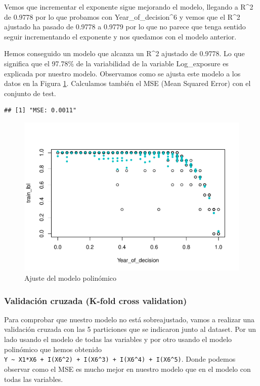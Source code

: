 \documentclass[
]{article}
\begin{document}
Vemos que incrementar el exponente sigue mejorando el modelo, llegando a
R\^{}2 de 0.9778 por lo que probamos con Year\_of\_decision\^{}6 y vemos
que el R\^{}2 ajustado ha pasado de 0.9778 a 0.9779 por lo que no parece
que tenga sentido seguir incrementando el exponente y nos quedamos con
el modelo anterior.

Hemos conseguido un modelo que alcanza un R\^{}2 ajustado de 0.9778. Lo
que significa que el 97.78\% de la variabilidad de la variable
Log\_exposure es explicada por nuestro modelo. Observamos como se ajusta
este modelo a los datos en la Figura \ref{fig:model_pol}. Calculamos
también el MSE (Mean Squared Error) con el conjunto de test.

\begin{verbatim}
## [1] "MSE: 0.0011"
\end{verbatim}

\begin{figure}

{\centering \includegraphics[width=0.75\linewidth]{anacalt-regresion_files/figure-latex/model_pol-1} 

}

\caption{Ajuste del modelo polinómico}\label{fig:model_pol}
\end{figure}

\hypertarget{validaciuxf3n-cruzada-k-fold-cross-validation}{%
\subsubsection{Validación cruzada (K-fold cross
validation)}\label{validaciuxf3n-cruzada-k-fold-cross-validation}}

Para comprobar que nuestro modelo no está sobreajustado, vamos a
realizar una validación cruzada con las 5 particiones que se indicaron
junto al dataset. Por un lado usando el modelo de todas las variables y
por otro usando el modelo polinómico que hemos obtenido
\texttt{\textquotesingle{}Y\ \textasciitilde{}\ X1*X6\ +\ I(X6\^{}2)\ +\ I(X6\^{}3)\ +\ I(X6\^{}4)\ +\ I(X6\^{}5)\textquotesingle{}}.
Donde podemos observar como el MSE es mucho mejor en nuestro modelo que
en el modelo con todas las variables.
\end{document}

